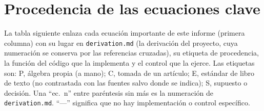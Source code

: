 \section{Procedencia de las ecuaciones clave}
\label{ap:procedencia}
\sloppy

La tabla siguiente enlaza cada ecuación importante de este informe (primera columna) con su lugar en \texttt{derivation.md} (la derivación del proyecto, cuya numeración se conserva por las referencias cruzadas), su etiqueta de procedencia, la función del código que la implementa y el control que la ejerce. Las etiquetas son: P, álgebra propia (a mano); C, tomada de un artículo; E, estándar de libro de texto (no contrastada con las fuentes salvo donde se indica); S, supuesto o decisión. Una ``ec.\ n'' entre paréntesis sin más es la numeración de \texttt{derivation.md}. ``---'' significa que no hay implementación o control específico.

